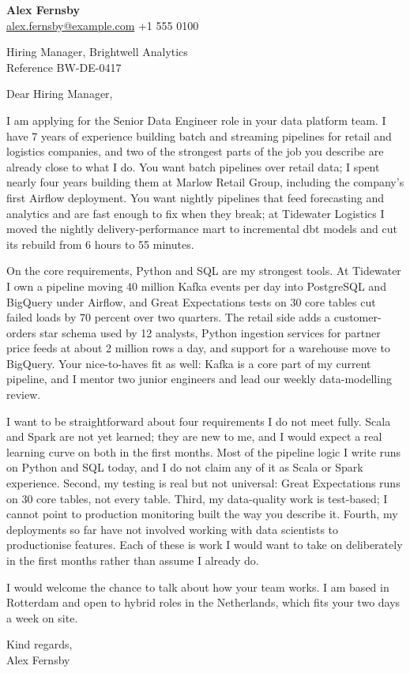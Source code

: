 \documentclass[11pt,a4paper]{article}
\begin{document}
\textbf{Alex Fernsby}\\
\href{mailto:alex.fernsby@example.com}{alex.fernsby@example.com} \quad +1 555 0100

\vspace{6pt}
Hiring Manager, Brightwell Analytics\\
Reference BW-DE-0417

\vspace{6pt}
Dear Hiring Manager,

I am applying for the Senior Data Engineer role in your data platform team. I have 7 years of experience
building batch and streaming pipelines for retail and logistics companies, and two of the strongest parts
of the job you describe are already close to what I do. You want batch pipelines over retail data; I spent
nearly four years building them at Marlow Retail Group, including the company's first Airflow deployment.
You want nightly pipelines that feed forecasting and analytics and are fast enough to fix when they break;
at Tidewater Logistics I moved the nightly delivery-performance mart to incremental dbt models and cut its
rebuild from 6 hours to 55 minutes.

On the core requirements, Python and SQL are my strongest tools. At Tidewater I own a pipeline moving 40
million Kafka events per day into PostgreSQL and BigQuery under Airflow, and Great Expectations tests on 30
core tables cut failed loads by 70 percent over two quarters. The retail side adds a customer-orders star
schema used by 12 analysts, Python ingestion services for partner price feeds at about 2 million rows a day,
and support for a warehouse move to BigQuery. Your nice-to-haves fit as well: Kafka is a core part of my
current pipeline, and I mentor two junior engineers and lead our weekly data-modelling review.

I want to be straightforward about four requirements I do not meet fully. Scala and Spark are not yet
learned; they are new to me, and I would expect a real learning curve on both in the first months. Most of
the pipeline logic I write runs on Python and SQL today, and I do not claim any of it as Scala or Spark
experience. Second, my testing is real but not universal: Great Expectations
runs on 30 core tables, not every table. Third, my data-quality work is test-based; I cannot point to
production monitoring built the way you describe it. Fourth, my deployments so far have not involved
working with data scientists to productionise features. Each of these is work I would want to take on
deliberately in the first months rather than assume I already do.

I would welcome the chance to talk about how your team works. I am based in Rotterdam and open to hybrid
roles in the Netherlands, which fits your two days a week on site.

Kind regards,\\
Alex Fernsby
\end{document}
